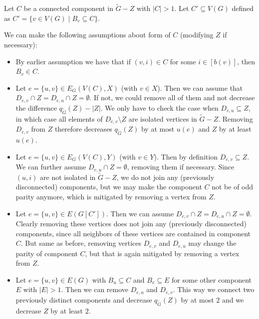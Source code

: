 \begin{exercise}{3}
    Let $C$ be a connected component in $\tilde{G} - Z$ with $|C| > 1$. Let $C'
    \subseteq V(G)$ defined as $C' = \{ v \in V(G) \mid B_v \subseteq C \}$.
    
    We can make the following assumptions about form of $C$ (modifying $Z$ if
    necessary):

    \begin{itemize}
        \item{By earlier assumption we have that if $(v, i) \in C$ for some $i
            \in [b(v)]$, then $B_v \in C$.}

        \item{Let $e = \{u, v\} \in E_G(V(C), X)$ (with $v \in X$). Then we can
            assume that $D_{e, v} \cap Z = D_{e, u} \cap Z = \emptyset$.
            If not, we could remove all of them and not decrease the
            difference $q_{\tilde{G}}(Z) - |Z|$. We only have to check the case
            when $D_{e, u} \subseteq Z$, in which case all elements of $D_{e,
            v} \setminus Z$ are isolated vertices in $\tilde{G} - Z$. Removing
            $D_{e, v}$ from $Z$ therefore decreases $q_{\tilde{G}}(Z)$ by at
            most $u(e)$ and $Z$ by at least $u(e)$.}

        \item{Let $e = \{u, v\} \in E_G(V(C), Y)$ (with $v \in Y$). Then by
            definition $D_{e, v} \subseteq Z$. We can further assume $D_{e, u}
            \cap Z = \emptyset$, removing them if necessary. Since $(u, i)$ are
            not isolated in $\tilde{G} - Z$, we do not join any (previously
            disconnected) components, but we may make the component $C$ not be
            of odd parity anymore, which is mitigated by removing a vertex from
            $Z$.}

        \item{Let $e = \{u, v\} \in E(G[C'])$. Then we can assume $D_{e, v} \cap
            Z = D_{e, u} \cap Z = \emptyset$. Clearly removing these vertices
            does not join any (previously disconnected) components, since all
            neighbors of these vertices are contained in component $C$. But same
            as before, removing vertices $D_{e, v}$ and $D_{e, u}$ may change
            the parity of component $C$, but that is again mitigated by removing
            a vertex from $Z$.}
    
        \item{Let $e = \{u, v\} \in E(G)$ with $B_u \subseteq C$ and $B_v \subseteq
            E$ for some other component $E$ with $|E| > 1$. Then we can
            remove $D_{e, u}$ and $D_{e, v}$. This
            way we connect two previously distinct components and decrease
            $q_{\tilde{G}}(Z)$ by at most $2$ and we decrease $Z$ by at
            least $2$.

}
\end{itemize}
\end{exercise}
